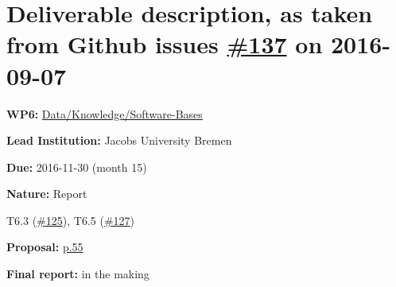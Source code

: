 \section*{\texorpdfstring{Deliverable description, as taken from Github issues
    \href{https://github.com/OpenDreamKit/OpenDreamKit/issues/137}{\#137} on
    2016-09-07}{Deliverable description, as taken from Github issue's \#137 on
    2016-09-07}}\label{deliverable-description-as-taken-from-github-issues-137-on-2016-09-07}
\begin{compactitem}
\tightlist
\item
  \textbf{WP6:}
  \href{https://github.com/OpenDreamKit/OpenDreamKit/tree/master/WP6}{Data/Knowledge/Software-Bases}
\item
  \textbf{Lead Institution:} Jacobs University Bremen
\item
  \textbf{Due:} 2016-11-30 (month 15)
\item
  \textbf{Nature:} Report
\item
  T6.3
  (\href{https://github.com/OpenDreamKit/OpenDreamKit/issues/125}{\#125}),
  T6.5
  (\href{https://github.com/OpenDreamKit/OpenDreamKit/issues/127}{\#127})
\item
  \textbf{Proposal:}
  \href{https://github.com/OpenDreamKit/OpenDreamKit/raw/master/Proposal/proposal-www.pdf}{p.55}
\item
  \textbf{Final report:} in the making
\end{compactitem}

